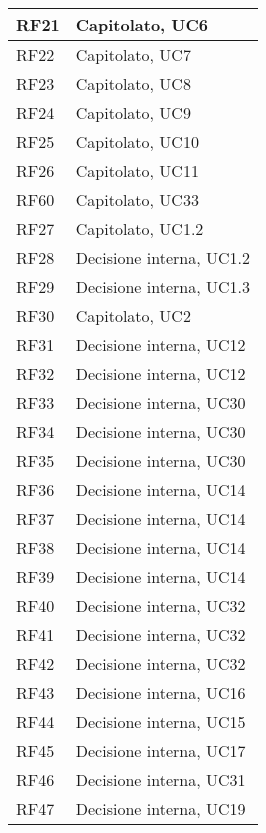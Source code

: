 \begin{center}
\begin{longtable}{|C{5cm}|C{5cm}|}
        \hline
        RF21 & Capitolato, UC6 \\
        \hline
        RF22 & Capitolato, UC7 \\
        \hline
        RF23 & Capitolato, UC8 \\
        \hline
        RF24 & Capitolato, UC9 \\
        \hline
        RF25 & Capitolato, UC10 \\
        \hline
        RF26 & Capitolato, UC11 \\
        \hline
        RF60 & Capitolato, UC33 \\
        \hline
        RF27 & Capitolato, UC1.2 \\
        \hline
        RF28 & Decisione interna, UC1.2 \\
        \hline
        RF29 & Decisione interna, UC1.3 \\
        \hline
        RF30 & Capitolato, UC2 \\
        \hline
        RF31 & Decisione interna, UC12 \\
        \hline
        RF32 & Decisione interna, UC12 \\
        \hline
        RF33 & Decisione interna, UC30 \\
        \hline
        RF34 & Decisione interna, UC30 \\
        \hline
        RF35 & Decisione interna, UC30 \\
        \hline
        RF36 & Decisione interna, UC14 \\
        \hline
        RF37 & Decisione interna, UC14 \\
        \hline
        RF38 & Decisione interna, UC14 \\
        \hline
        RF39 & Decisione interna, UC14 \\
        \hline
        RF40 & Decisione interna, UC32 \\
        \hline
        RF41 & Decisione interna, UC32 \\
        \hline
        RF42 & Decisione interna, UC32 \\
        \hline
        RF43 & Decisione interna, UC16 \\
        \hline
        RF44 & Decisione interna, UC15 \\
        \hline
        RF45 & Decisione interna, UC17 \\
        \hline
        RF46 & Decisione interna, UC31 \\
        \hline
        RF47 & Decisione interna, UC19 \\

\end{longtable}
\end{center}
